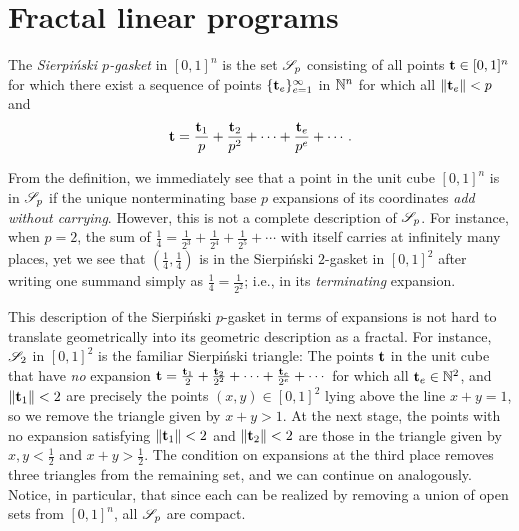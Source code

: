 \documentclass[11pt]{amsart}
\begin{document}

\section{Fractal linear programs}

\begin{definition}
 The \emph{Sierpi\'nski $p$-gasket} in $[0,1]^n$ is the set $\mathscr{S}_p$ consisting of all points $\mathbf{t}\in [0,1]^n$ for which there exist a sequence of points $\{ \mathbf{t}_e \}_{e=1}^\infty$ in $\mathbb{N}^n$ for which all $\| \mathbf{t}_e \| < p$ and 
 \[
\mathbf{t} = \frac{\mathbf{t}_1}{p} +\frac{\mathbf{t}_2}{p^2}+\cdots +\frac{\mathbf{t}_e}{p^e} + \cdots.  
 \]
\end{definition}


From the definition, we immediately see that a point in the unit cube $[0,1]^n$ is in $\mathscr{S}_p$ if the unique nonterminating base $p$ expansions of its coordinates \emph{add without carrying}.  However, this is not a complete description of $\mathscr{S}_p$.  For instance, when $p=2$, the sum of $\frac{1}{4} = \frac{1}{2^3} + \frac{1}{2^4} + \frac{1}{2^5} + \cdots$ with itself carries at infinitely many places, yet we see that $\left(\frac{1}{4}, \frac{1}{4}\right)$ is in the Sierpi\'nski $2$-gasket in $[0,1]^2$ after writing one summand simply as $\frac{1}{4} = \frac{1}{2^2}$; i.e., in its \emph{terminating} expansion.


This description of the Sierpi\'nski $p$-gasket in terms of expansions is not hard to translate geometrically into its geometric description as a fractal. 
For instance, $\mathscr{S}_2$ in $[0,1]^2$ is the familiar Sierpi\'nski triangle:   
The points $\mathbf{t}$ in the unit cube that have \emph{no} expansion $\mathbf{t} = \frac{\mathbf{t}_1}{2} +\frac{\mathbf{t}_2}{2^2}+\cdots +\frac{\mathbf{t}_e}{2^e} + \cdots$
 for which all $\mathbf{t}_e \in \mathbb{N}^2$, and $\| \mathbf{t}_1 \| < 2$ are precisely 
the points $(x,y) \in [0,1]^2$ lying above the line $x+y=1$, so we remove the triangle given by $x+y>1$.
At the next stage, the points with no expansion satisfying
$\| \mathbf{t}_1 \| < 2$ and  $\| \mathbf{t}_2 \| < 2$
are those in the triangle given by $x, y < \frac{1}{2}$ and $x+y > \frac{1}{2}$.  
The condition on expansions at the third place removes three triangles from the remaining set, and we can continue on analogously. 
Notice, in particular, that since each can be realized by removing a union of open sets from $[0,1]^n$, all $\mathscr{S}_p$ are compact.  
\end{document}
